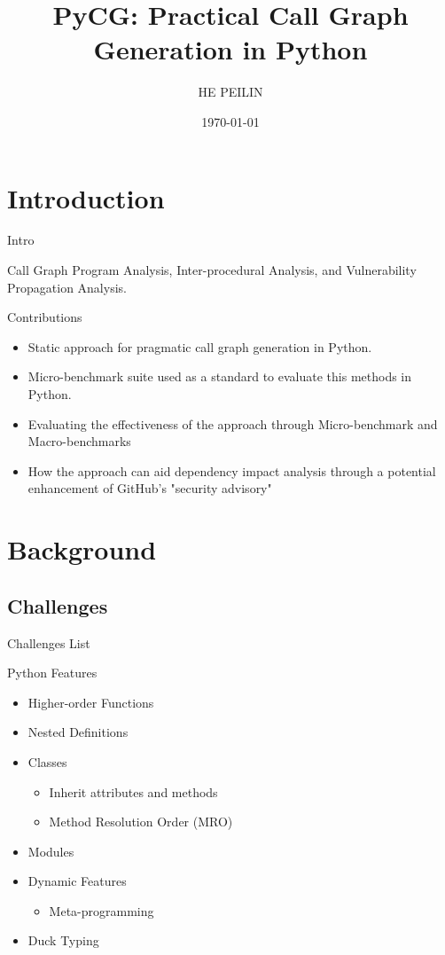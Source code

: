 \documentclass[9pt, xcolor=table]{beamer}
\title[PyCG] {PyCG: Practical Call Graph Generation in Python}
\author[HE PEILIN]{HE PEILIN}
\institute[MUST] {2021 IEEE/ACM 43rd International Conference on Software Engineering (ICSE)\cite{9402076}}
\date{\today}
\begin{document}
%
\begin{frame}[plain]
	\titlepage\cite{latex_bearmer_template}
\end{frame}
%
%
%
\section{Introduction}
\begin{frame}{Intro}
	\begin{block}{Call Graph} 
		Program Analysis, Inter-procedural Analysis,
	 	and Vulnerability Propagation Analysis.
	\end{block}

	\vfill
    \begin{displayquote}{Contributions}
	\begin{itemize}
		\item Static approach for pragmatic call graph generation in Python.
		\item Micro-benchmark suite used as a standard to evaluate this methods in Python.
		\item Evaluating the effectiveness of the approach through Micro-benchmark and Macro-benchmarks 
		\item How the approach can aid dependency impact analysis through a potential enhancement of GitHub’s
		"security advisory"
	\end{itemize}
    \end{displayquote}
\end{frame}
%
\section{Background}
%
\subsection{Challenges}
\begin{frame}{Challenges List}
	\begin{alertblock}{Python Features}
		\begin{itemize}
			\item Higher-order Functions
			\item Nested Definitions
			\item Classes
				\begin{itemize}
					\item Inherit attributes and methods
					\item Method Resolution Order (MRO)
				\end{itemize}
			\item Modules
			\item Dynamic Features 
				\begin{itemize}
					\item Meta-programming
				\end{itemize}
			\item Duck Typing
		\end{itemize}
	\end{alertblock}	
\end{frame}
%
\end{document}
